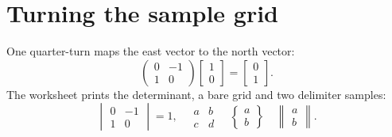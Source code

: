 \documentclass{article}
\begin{document}
\section*{Turning the sample grid}

One quarter-turn maps the east vector to the north vector:
\[
 \begin{pmatrix}0&-1\\1&0\end{pmatrix}\begin{bmatrix}1\\0\end{bmatrix}
 =\begin{bmatrix}0\\1\end{bmatrix}.
\]
The worksheet prints the determinant, a bare grid and two delimiter samples:
\[
 \begin{vmatrix}0&-1\\1&0\end{vmatrix}=1,\quad
 \begin{matrix}a&b\\c&d\end{matrix}\quad
 \begin{Bmatrix}a\\b\end{Bmatrix}\quad
 \begin{Vmatrix}a\\b\end{Vmatrix}.
\]
\end{document}
